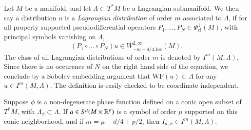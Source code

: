 Let $M$ be a manifold, and let $\Lambda \subset T^* M$ be a Lagrangian submanifold. We then say a distribution $u$ is a \emph{Lagrangian distribution} of order $m$ associated to $\Lambda$, if for all properly supported pseudodifferential operators $P_1,\dots,P_N \in \Psi^1_{\text{cl}}(M)$, with principal symbols vanishing on $\Lambda$,
%
\[ (P_1 \circ \dots \circ P_N) u \in W^{2,\infty}_{-m-d/4, \text{loc}}(M). \]
%
The class of all Lagrangian distributions of order $m$ is denoted by $I^m(M,\Lambda)$. Since there is no occurence of $N$ on the right hand side of the equation, we conclude by a Sobolev embedding argument that $\text{WF}(u) \subset \Lambda$ for any $u \in I^m(M,\Lambda)$. The definition is easily checked to be coordinate independent.

\begin{lemma}
    Suppose $\phi$ is a non-degenerate phase function defined on a conic open subset of $T^* M$, with $\Lambda_\phi \subset \Lambda$. If $a \in S^\mu(M \times \operatorname{\mathbb{R}}^p)$ is a symbol of order $\mu$ supported on this conic neighborhood, and if $m = \mu - d/4 + p/2$, then $I_{a,\phi} \in I^m(M,\Lambda)$.
\end{lemma}
